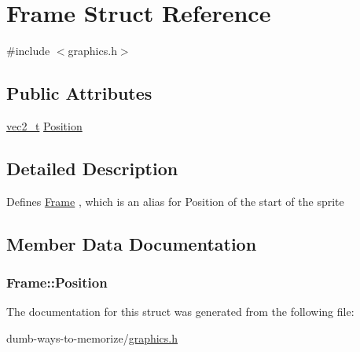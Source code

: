 \hypertarget{struct_frame}{}\section{Frame Struct Reference}
\label{struct_frame}


{\ttfamily \#include $<$graphics.\+h$>$}

\subsection*{Public Attributes}
\begin{DoxyCompactItemize}
\item 
\hyperlink{globals_8h_a773f2054819bb6014f1e50baa39cb5e3}{vec2\+\_\+t} \hyperlink{struct_frame_ad146076c6fd7a2f4aa7031aaf2b17a22}{Position}
\end{DoxyCompactItemize}


\subsection{Detailed Description}
Defines \hyperlink{struct_frame}{Frame} , which is an alias for Position of the start of the sprite 

\subsection{Member Data Documentation}
\subsubsection[{\texorpdfstring{Position}{Position}}]{ Frame\+::\+Position}\hypertarget{struct_frame_ad146076c6fd7a2f4aa7031aaf2b17a22}{}\label{struct_frame_ad146076c6fd7a2f4aa7031aaf2b17a22}


The documentation for this struct was generated from the following file\+:\begin{DoxyCompactItemize}
\item 
dumb-\/ways-\/to-\/memorize/\hyperlink{graphics_8h}{graphics.\+h}\end{DoxyCompactItemize}
